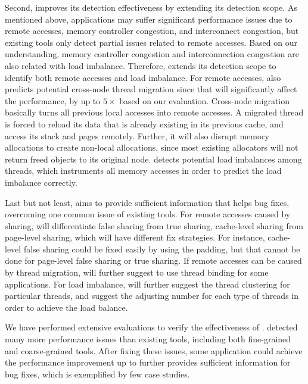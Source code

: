 Second, \NP{} improves its detection effectiveness by extending its detection scope. As mentioned above, applications may suffer significant performance issues due to remote accesses, memory controller congestion, and interconnect congestion, but existing tools only detect partial issues related to remote accesses. Based on our understanding, memory controller congestion and interconnection congestion are also related with load imbalance. Therefore, \NP{} extends its detection scope to identify both remote accesses and load imbalance. For remote accesses, \NP{} also predicts potential cross-node thread migration since that will significantly affect the performance, by up to $5\times$ based on our evaluation. Cross-node migration basically turns all previous local accesses into remote accesses. A migrated thread is forced to reload its data that is already existing in its previous cache, and access its stack and pages remotely. Further, it will also disrupt memory allocations to create non-local allocations, since most existing allocators will not return freed objects to its original node. \NP{} detects potential load imbalances among threads, which instruments all memory accesses in order to predict the load imbalance correctly. 

Last but not least, \NP{} aims to provide sufficient information that helps bug fixes, overcoming one common issue of existing tools. For remote accesses caused by sharing, \NP{} will differentiate false sharing from true sharing, cache-level sharing from page-level sharing, which will have different fix strategies. For instance, cache-level false sharing could be fixed easily by using the padding, but that cannot be done for page-level false sharing or true sharing. If remote accesses can be caused by thread migration, \NP{} will further suggest to use thread binding for some applications. For load imbalance, \NP{} will further suggest the thread clustering for particular threads, and suggest the adjusting number for each type of threads in order to achieve the load balance.   



We have performed extensive evaluations to verify the effectiveness of \NP{}. \NP{} detected many more performance issues than existing tools, including both fine-grained and coarse-grained tools. After fixing these issues, some application could achieve the performance improvement up to %
\NP{} further provides sufficient information for bug fixes, which is exemplified by few case studies. 

